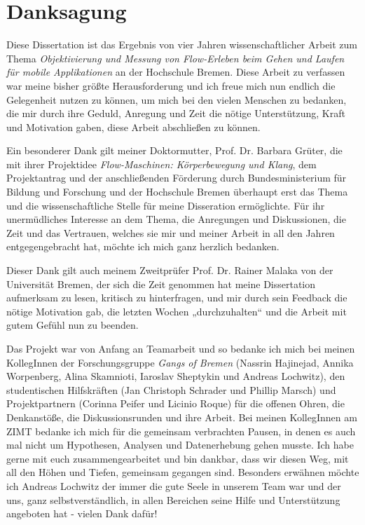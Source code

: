 \section*{Danksagung}

Diese Dissertation ist das Ergebnis von vier Jahren wissenschaftlicher Arbeit zum Thema \emph{Objektivierung und Messung von Flow-Erleben beim Gehen und Laufen für mobile Applikationen} an der Hochschule Bremen. Diese Arbeit zu verfassen war meine bisher größte Herausforderung und ich freue mich nun endlich die Gelegenheit nutzen zu können, um mich bei den vielen Menschen zu bedanken, die mir durch ihre Geduld, Anregung und Zeit die nötige Unterstützung, Kraft und Motivation gaben, diese Arbeit abschließen zu können.

Ein besonderer Dank gilt meiner Doktormutter, Prof. Dr. Barbara Grüter, die mit ihrer Projektidee \emph{Flow-Maschinen: Körperbewegung und Klang}, dem Projektantrag und der anschließenden Förderung durch Bundesministerium für Bildung und Forschung und der Hochschule Bremen überhaupt erst das Thema und die wissenschaftliche Stelle für meine Disseration ermöglichte. Für ihr unermüdliches Interesse an dem Thema, die Anregungen und Diskussionen, die Zeit und das Vertrauen, welches sie mir und meiner Arbeit in all den Jahren entgegengebracht hat, möchte ich mich ganz herzlich bedanken.

Dieser Dank gilt auch meinem Zweitprüfer Prof. Dr. Rainer Malaka von der Universität Bremen, der sich die Zeit genommen hat meine Dissertation aufmerksam zu lesen, kritisch zu hinterfragen, und mir durch sein Feedback die nötige Motivation gab, die letzten Wochen „durchzuhalten“ und die Arbeit mit gutem Gefühl nun zu beenden.

Das Projekt war von Anfang an Teamarbeit und so bedanke ich mich bei meinen KollegInnen der Forschungsgruppe \emph{Gangs of Bremen} (Nassrin Hajinejad, Annika Worpenberg, Alina Skamnioti, Iaroslav Sheptykin und Andreas Lochwitz), den studentischen Hilfskräften (Jan Christoph Schrader und Phillip Marsch) und Projektpartnern (Corinna Peifer und Licinio Roque) für die offenen Ohren, die Denkanstöße, die Diskussionsrunden und ihre Arbeit. Bei meinen KollegInnen am ZIMT bedanke ich mich für die gemeinsam verbrachten Pausen, in denen es auch mal nicht um Hypothesen, Analysen und Datenerhebung gehen musste. Ich habe gerne mit euch zusammengearbeitet und bin dankbar, dass wir diesen Weg, mit all den Höhen und Tiefen, gemeinsam gegangen sind. Besonders erwähnen möchte ich Andreas Lochwitz der immer die gute Seele in unserem Team war und der uns, ganz selbstverständlich, in allen Bereichen seine Hilfe und Unterstützung angeboten hat - vielen Dank dafür! 

